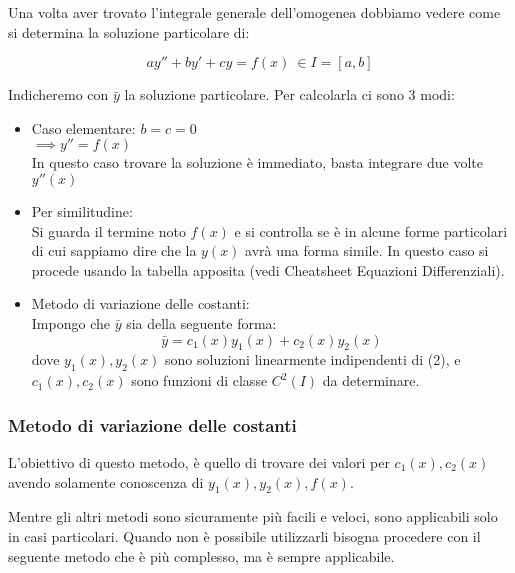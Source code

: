 Una volta aver trovato l'integrale generale dell'omogenea dobbiamo vedere come si determina la soluzione particolare di:

\[
    ay''+by'+cy = f(x)\ \in I=[a,b]
\]

Indicheremo con \(\bar{y}\) la soluzione particolare. Per calcolarla ci sono 3 modi:

\begin{itemize}
    \item Caso elementare: \(b =c = 0\) \\
          \(\implies y'' = f(x)\) \\
          In questo caso trovare la soluzione è immediato, basta integrare due volte \(y''(x)\)
    \item Per similitudine: \\
          Si guarda il termine noto \(f(x)\) e si controlla se è in alcune forme particolari di cui sappiamo dire che la \(y(x)\) avrà una forma simile.
          In questo caso si procede usando la tabella apposita (vedi Cheatsheet Equazioni Differenziali).
    \item Metodo di variazione delle costanti: \\
          Impongo che \(\bar{y}\) sia della seguente forma:
          \[
              \bar{y} = c_1(x) y_1(x) + c_2(x) y_2(x)
          \]
          dove \({y_1(x),y_2(x)}\) sono soluzioni linearmente indipendenti di (2), e \(c_1(x),c_2(x)\) sono funzioni di classe \(C^{2}(I)\) da determinare.
\end{itemize}

\subsubsection*{Metodo di variazione delle costanti}

L'obiettivo di questo metodo, è quello di trovare dei valori per \(c_1(x), c_2(x)\) avendo solamente conoscenza di \(y_1(x), y_2(x), f(x)\).

Mentre gli altri metodi sono sicuramente più facili e veloci, sono applicabili solo in casi particolari. Quando non è possibile utilizzarli bisogna procedere con il seguente metodo che è più complesso, ma è sempre applicabile.

